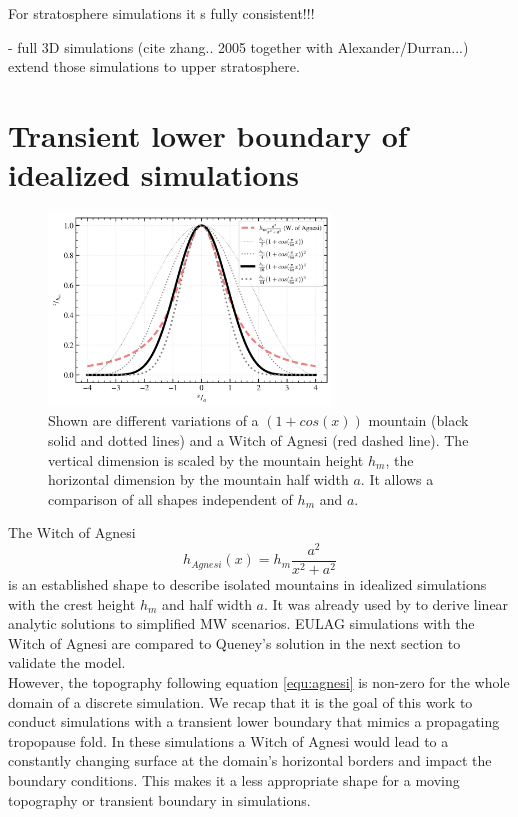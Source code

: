 For stratosphere simulations it s fully consistent!!! 

- full 3D simulations (cite zhang.. 2005 together with Alexander/Durran...) extend those simulations to upper stratosphere.


\section{Transient lower boundary of idealized simulations}
\label{sec:trans-boundary}
\begin{figure}[tbp]
    \centering
    \includegraphics[width=0.67\textwidth]{figures_model/topo-transient-boundary.png}
    \caption{Shown are different variations of a $(1+cos(x))$ mountain (black solid and dotted lines) and a Witch of Agnesi (red dashed line). The vertical dimension is scaled by the mountain height $h_m$, the horizontal dimension by the mountain half width $a$. It allows a comparison of all shapes independent of $h_m$ and $a$.}
    \label{fig:topo_trans}
\end{figure} 
The Witch of Agnesi
\begin{equation}
    h_{Agnesi}(x) = h_m \frac{a^2}{x^2+a^2}
    \label{equ:agnesi}
\end{equation}
is an established shape to describe isolated mountains in idealized simulations with the crest height $h_m$ and half width $a$. It was already used by \textcite{queney_problem_1948} to derive linear analytic solutions to simplified MW scenarios. EULAG simulations with the Witch of Agnesi are compared to Queney's solution in the next section to validate the model. \\
However, the topography following equation \ref{equ:agnesi} is non-zero for the whole domain of a discrete simulation. We recap that it is the goal of this work to conduct simulations with a transient lower boundary that mimics a propagating tropopause fold. In these simulations a Witch of Agnesi would lead to a constantly changing surface at the domain's horizontal borders and impact the boundary conditions. This makes it a less appropriate shape for a moving topography or transient boundary in simulations. \\
